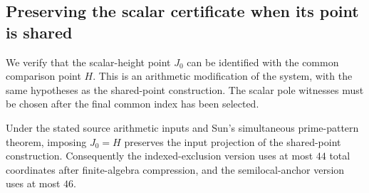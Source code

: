 \subsection{Preserving the scalar certificate when its point is shared}
\label{subsec:independent-height-sharing}

We verify that the scalar-height point $J_0$ can be identified with the
common comparison point $H$.  This is an arithmetic modification of the
system, with the same hypotheses as the shared-point construction.  The
scalar pole witnesses must be chosen after the final common index has
been selected.

\begin{proposition}
Under the stated source arithmetic inputs and Sun's simultaneous
prime-pattern theorem, imposing $J_0=H$ preserves the input projection
of the shared-point construction.  Consequently the indexed-exclusion
version uses at most $44$ total coordinates after finite-algebra
compression, and the semilocal-anchor version uses at most $46$.
\end{proposition}
